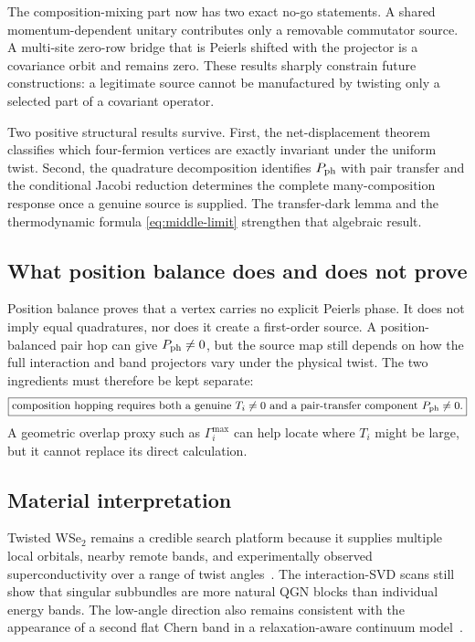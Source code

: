 \documentclass[11pt]{article}
\theoremstyle{remark}
\begin{document}
The composition-mixing part now has two exact no-go statements.  A shared momentum-dependent unitary contributes only a removable commutator source.  A multi-site zero-row bridge that is Peierls shifted with the projector is a covariance orbit and remains zero.  These results sharply constrain future constructions: a legitimate source cannot be manufactured by twisting only a selected part of a covariant operator.

Two positive structural results survive.  First, the net-displacement theorem classifies which four-fermion vertices are exactly invariant under the uniform twist.  Second, the quadrature decomposition identifies $P_{\rm ph}$ with pair transfer and the conditional Jacobi reduction determines the complete many-composition response once a genuine source is supplied.  The transfer-dark lemma and the thermodynamic formula \eqref{eq:middle-limit} strengthen that algebraic result.

\subsection{What position balance does and does not prove}

Position balance proves that a vertex carries no explicit Peierls phase.  It does not imply equal quadratures, nor does it create a first-order source.  A position-balanced pair hop can give $P_{\rm ph}\ne0$, but the source map still depends on how the full interaction and band projectors vary under the physical twist.  The two ingredients must therefore be kept separate:
\begin{equation}
 \boxed{
 \text{composition hopping requires both a genuine }T_i\ne0
 \text{ and a pair-transfer component }P_{\rm ph}\ne0.}
 \label{eq:revised-core-criterion}
\end{equation}
A geometric overlap proxy such as $\Gamma_i^{\max}$ can help locate where $T_i$ might be large, but it cannot replace its direct calculation.

\subsection{Material interpretation}

Twisted WSe$_2$ remains a credible search platform because it supplies multiple local orbitals, nearby remote bands, and experimentally observed superconductivity over a range of twist angles~\cite{xia2025,guo2026}.  The interaction-SVD scans still show that singular subbundles are more natural QGN blocks than individual energy bands.  The low-angle direction also remains consistent with the appearance of a second flat Chern band in a relaxation-aware continuum model~\cite{zhang2025}.
\end{document}
